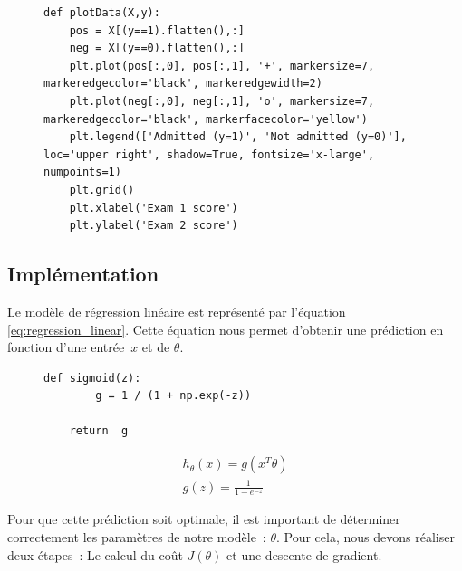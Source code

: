 \begin{figure}[!h]
\begin{verbatim}
def plotData(X,y):
    pos = X[(y==1).flatten(),:]
    neg = X[(y==0).flatten(),:]
    plt.plot(pos[:,0], pos[:,1], '+', markersize=7, markeredgecolor='black', markeredgewidth=2) 
    plt.plot(neg[:,0], neg[:,1], 'o', markersize=7, markeredgecolor='black', markerfacecolor='yellow') 
    plt.legend(['Admitted (y=1)', 'Not admitted (y=0)'], loc='upper right', shadow=True, fontsize='x-large', numpoints=1) 
    plt.grid()
    plt.xlabel('Exam 1 score')
    plt.ylabel('Exam 2 score')
\end{verbatim}   
\end{figure}

    \subsection{Implémentation}

    Le modèle de régression linéaire est représenté par l'équation \ref{eq:regression_linear}. Cette équation nous permet d'obtenir une prédiction en fonction d'une entrée~$x$ et de $\theta$.
    
\begin{figure}[!h]
    \begin{minipage}{.48\linewidth}
\begin{verbatim}
def sigmoid(z):
        g = 1 / (1 + np.exp(-z))

    return  g
\end{verbatim}   
    \end{minipage}\hfill
    \begin{minipage}{.48\linewidth}
        \begin{align}\label{eq:regression_linear}
            h_\theta(x) = g (x^T \theta ) \\
            g(z)=\frac{1}{1-e^{-z}} 
        \end{align}
\end{minipage}
\end{figure}
    
    \noindent
    Pour que cette prédiction soit optimale, il est important de déterminer correctement les paramètres de notre modèle~: $\theta$. Pour cela, nous devons réaliser deux étapes~: Le calcul du coût $J(\theta)$ et une descente de gradient.

